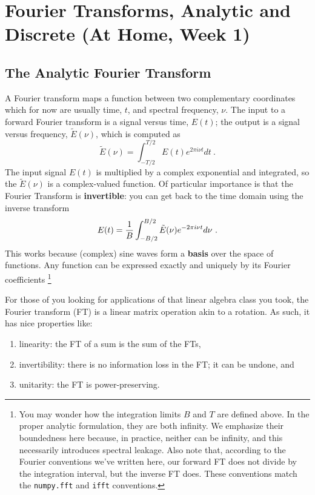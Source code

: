 \documentclass[11pt,preprint]{aastex}
\begin{document}
\section{Fourier Transforms, Analytic and Discrete (At Home, Week 1)} 
\label{pwrspectrum}
 
\subsection{The Analytic Fourier Transform}

\noindent
A Fourier transform maps a function between two complementary coordinates which
for now are usually time, $t$, and spectral frequency, $\nu$.
The input to a forward Fourier transform is a signal versus time, 
$E(t)$; the output is a signal versus frequency, $\tilde E(\nu)$,
which is computed as
% 
\begin{equation}
\tilde E(\nu) = \int_{-T/2}^{T/2} E(t) e^{2 \pi i \nu t} dt \ .
\label{eq:dft}
\end{equation}
% 
\noindent The input signal $E(t)$ is multiplied by a complex
exponential and integrated, so the $\tilde E(\nu)$ is a complex-valued function. Of particular
importance is that the Fourier Transform is {\bf invertible}: 
you can get back to the time domain using the inverse transform
%
\begin{equation}
E(t) = {1 \over B} \int_{-B/2}^{B/2} \tilde E(\nu) e^{-2 \pi i \nu t} d\nu \ .
\end{equation}
% 
This works because (complex) sine waves form a {\bf basis} over the space of functions.
Any function can be expressed exactly and uniquely by its Fourier coefficients
\footnote{You may wonder how
the integration limits $B$ and $T$ are defined above. In the proper
analytic formulation, they are both infinity. We emphasize their
boundedness here because, in practice, 
neither can be infinity, and this necessarily introduces spectral leakage. Also note that,
according to the Fourier conventions we've written here, our forward FT does not divide
by the integration interval, but the inverse FT does.  These conventions match 
the {\tt numpy.fft}
and {\tt ifft} conventions.}

For those of you looking for applications of that linear algebra class you took,
the Fourier transform (FT) is a linear matrix operation akin to a rotation. 
As such, it has nice properties like:
\begin{enumerate}
\item linearity: the FT
of a sum is the sum of the FTs, 
\item invertibility: there is no information loss in the FT; it can be undone, and 
\item unitarity: the FT is power-preserving.
\end{enumerate}
\end{document}
